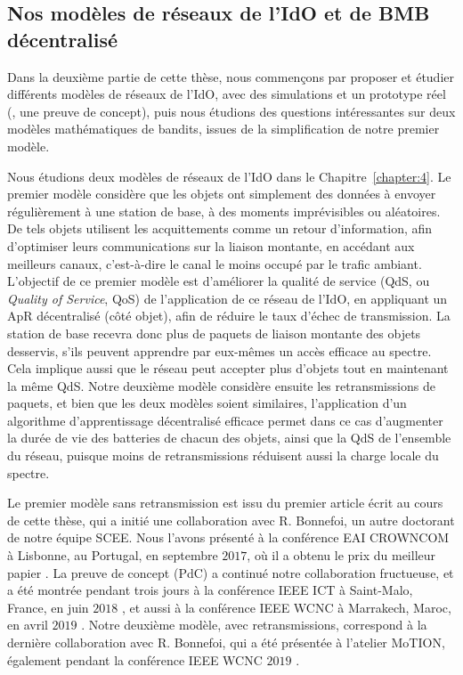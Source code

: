 \begin{resume_fr}
\subsection*{Nos modèles de réseaux de l'IdO et de BMB décentralisé}

Dans la deuxième partie de cette thèse, nous commençons par proposer et étudier différents modèles de réseaux de l'IdO, avec des simulations et un prototype réel (\ie, une preuve de concept), puis nous étudions des questions intéressantes sur deux modèles mathématiques de bandits, issues de la simplification de notre premier modèle.


%
Nous étudions deux modèles de réseaux de l'IdO dans le Chapitre~\ref{chapter:4}.
Le premier modèle considère que les objets ont simplement des données à envoyer régulièrement à une station de base, à des moments imprévisibles ou aléatoires.
De tels objets utilisent les acquittements comme un retour d'information, afin d'optimiser leurs communications sur la liaison montante, en accédant aux meilleurs canaux, c'est-à-dire le canal le moins occupé par le trafic ambiant.
L'objectif de ce premier modèle est d'améliorer la qualité de service (QdS, ou \emph{Quality of Service}, QoS) de l'application de ce réseau de l'IdO, en appliquant un ApR décentralisé (côté objet), afin de réduire le taux d'échec de transmission.
La station de base recevra donc plus de paquets de liaison montante des objets desservis, s'ils peuvent apprendre par eux-mêmes un accès efficace au spectre.
Cela implique aussi que le réseau peut accepter plus d'objets tout en maintenant la même QdS.
%
Notre deuxième modèle considère ensuite les retransmissions de paquets, et bien que les deux modèles soient similaires, l'application d'un algorithme d'apprentissage décentralisé efficace permet dans ce cas d'augmenter la durée de vie des batteries de chacun des objets, ainsi que la QdS de l'ensemble du réseau, puisque moins de retransmissions réduisent aussi la charge locale du spectre.

Le premier modèle sans retransmission est issu du premier article écrit au cours de cette thèse, qui a initié une collaboration avec R. Bonnefoi, un autre doctorant de notre équipe SCEE.
Nous l'avons présenté à la conférence EAI CROWNCOM à Lisbonne, au Portugal, en septembre $2017$, où il a obtenu le \guillemotleft{} prix du meilleur papier \guillemotright{} \cite{Bonnefoi17}.
%
La preuve de concept (PdC) a continué notre collaboration fructueuse, et a été montrée pendant trois jours à la conférence IEEE ICT à Saint-Malo, France, en juin $2018$ \cite{Besson2018ICT}, et aussi à la conférence IEEE WCNC à Marrakech, Maroc, en avril $2019$ \cite{Besson2019WCNC}.
%
Notre deuxième modèle, avec retransmissions, correspond à la dernière collaboration avec R. Bonnefoi, qui a été présentée à l'atelier MoTION, également pendant la conférence IEEE WCNC $2019$ \cite{Bonnefoi2019WCNC}.



\end{resume_fr}
